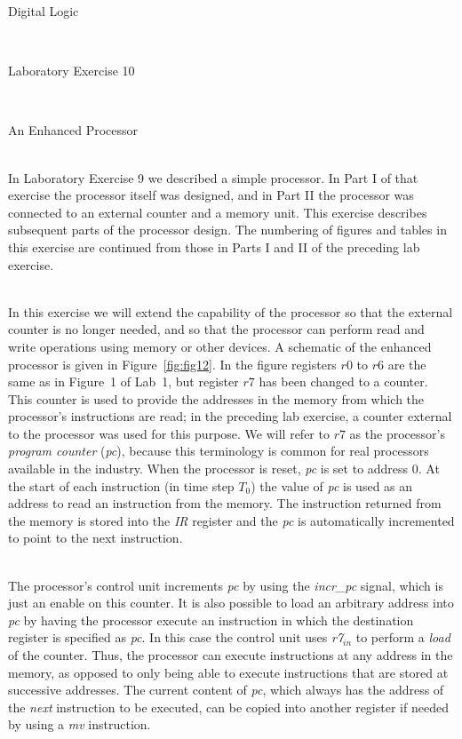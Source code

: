 \documentclass[epsfig,10pt,fullpage]{article}
\newcommand{\LabNum}{10}
\begin{document}
\centerline{\huge Digital Logic}
~\\
\centerline{\huge Laboratory Exercise \LabNum}
~\\
\centerline{\large An Enhanced Processor}
~\\

In Laboratory Exercise 9 we described a simple processor. In
Part I of that exercise the processor itself was designed, and in Part II the processor was
connected to an external counter and a memory unit. This exercise describes subsequent
parts of the processor design. The numbering of figures and tables in this exercise 
are continued from those in Parts I and II of the preceding lab exercise.

~\\
\noindent
In this exercise we will extend the capability of the processor so that the external counter 
is no longer needed, and so that the processor can perform read and
write operations using memory or other devices. 
A schematic of the enhanced processor is given in Figure~\ref{fig:fig12}. In the figure
registers $r0$ to $r6$ are the same as in Figure~1 of Lab~1, but register $r7$ has 
been changed to a counter. This counter is used to provide the addresses in the memory from 
which the processor's instructions are read; in the preceding 
lab exercise, a counter external to the processor was used for this purpose. 
We will refer to $r7$ as the processor's {\it program counter} ({\it pc}), because this 
terminology is common for real processors available in the industry. When the processor is 
reset, {\it pc} is set to address 0. At the start of each instruction (in time step $T_0$) the 
value of {\it pc} is used as an address to read an instruction from the memory. The instruction
returned from the memory is stored into the {\it IR} register and the {\it pc} is automatically
incremented to point to the next instruction.

~\\
\noindent
The processor's control unit increments {\it pc} by using the {\it incr\_pc} signal, which is
just an enable on this counter. It is also possible to load an arbitrary address into 
{\it pc} by having the processor execute an instruction in which the destination register is 
specified as {\it pc}. In this case the control unit uses {\it r7}$_{in}$ to perform 
a {\it load} of the counter. Thus, the processor can execute instructions at any address 
in the memory, as opposed to only being able to execute instructions that are stored at 
successive addresses. The current content of {\it pc}, which always has the address of 
the {\it next} instruction to be executed, can be copied into another register if needed 
by using a {\it mv} instruction. 
\end{document}
